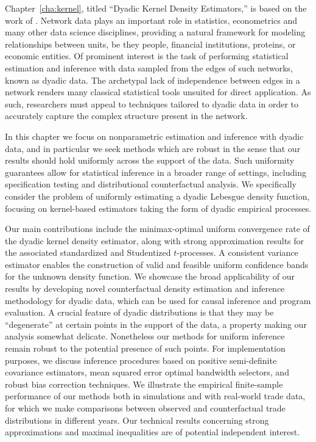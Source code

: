 Chapter~\ref{cha:kernel}, titled ``Dyadic Kernel Density Estimators,'' is based
on the work of \cite{cattaneo2024uniform}.
Network data plays an important role in statistics, econometrics and many other
data science disciplines, providing a natural framework for modeling
relationships between units, be they people, financial institutions, proteins,
or economic entities. Of prominent interest is the task of performing
statistical estimation and inference with data sampled from the edges of such
networks, known as dyadic data. The archetypal lack of independence between
edges in a network renders many classical statistical tools unsuited for direct
application. As such, researchers must appeal to techniques tailored to dyadic
data in order to accurately capture the complex structure present in the
network.

In this chapter we focus on nonparametric estimation and inference with dyadic
data, and in particular we seek methods which are robust in the sense that our
results should hold uniformly across the support of the data.
Such uniformity guarantees allow for statistical inference in a broader range of
settings, including specification testing and distributional
counterfactual analysis. We specifically
consider the problem of uniformly estimating a dyadic Lebesgue density
function, focusing on kernel-based estimators taking the form of dyadic
empirical processes.

Our main contributions include the minimax-optimal uniform convergence rate of
the dyadic kernel density estimator, along with strong approximation results
for the associated standardized and Studentized $t$-processes. A consistent
variance estimator enables the construction of valid and feasible uniform
confidence bands for the unknown density function. We showcase the broad
applicability of our results by developing novel counterfactual density
estimation and inference methodology for dyadic data, which can be used for
causal inference and program evaluation.
A crucial feature of dyadic distributions is that they may be ``degenerate'' at
certain points in the support of the data, a property making our analysis
somewhat delicate. Nonetheless our methods for uniform inference remain robust
to the potential presence of such points.
For implementation purposes, we discuss inference procedures based on positive
semi-definite covariance estimators, mean squared error optimal bandwidth
selectors, and robust bias correction techniques. We illustrate the empirical
finite-sample performance of our methods both in simulations and with
real-world trade data, for which we make comparisons between observed and
counterfactual trade distributions in different years. Our technical results
concerning strong approximations and maximal inequalities are of potential
independent interest.

